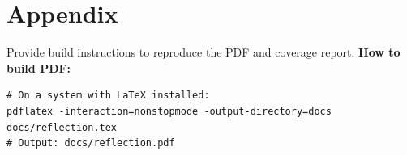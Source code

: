 \documentclass[11pt]{article}
\begin{document}
\section{Appendix}
Provide build instructions to reproduce the PDF and coverage report.
\vspace{6pt}
\textbf{How to build PDF:}
\begin{verbatim}
# On a system with LaTeX installed:
pdflatex -interaction=nonstopmode -output-directory=docs docs/reflection.tex
# Output: docs/reflection.pdf
\end{verbatim}
\end{document}
